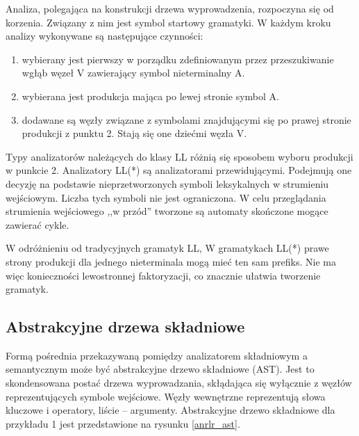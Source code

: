 Analiza, polegająca na konstrukcji drzewa
wyprowadzenia, rozpoczyna się od korzenia. Związany z nim jest symbol 
startowy gramatyki. W każdym kroku analizy wykonywane są następujące czynności:
\begin{enumerate}
\item wybierany jest pierwszy w porządku zdefiniowanym przez
  przeszukiwanie wgłąb węzeł V zawierający symbol nieterminalny A.
\item wybierana jest produkcja mająca po lewej stronie symbol A.
\item dodawane są węzły związane z symbolami znajdującymi się po prawej
  stronie produkcji z punktu 2. Stają się one dziećmi węzła V.
\end{enumerate}

Typy analizatorów należących do klasy LL różnią się sposobem wyboru produkcji w punkcie 2. 
Analizatory LL(*) są analizatorami przewidującymi. Podejmują one decyzję na
podstawie nieprzetworzonych symboli leksykalnych w strumieniu wejściowym. Liczba
tych symboli nie jest ograniczona. W celu przeglądania strumienia wejściowego 
,,w przód'' tworzone są automaty skończone mogące zawierać cykle.

W odróżnieniu od tradycyjnych gramatyk LL, W gramatykach LL(*) prawe strony
produkcji dla jednego nieterminala mogą mieć ten sam prefiks. Nie ma więc 
konieczności lewostronnej faktoryzacji, co znacznie ułatwia tworzenie
gramatyk.

\subsection{Abstrakcyjne drzewa składniowe}

Formą pośrednia przekazywaną pomiędzy analizatorem składniowym a semantycznym
może być abstrakcyjne drzewo składniowe (AST). Jest to skondensowana postać drzewa
wyprowadzania, skłądająca się
wyłącznie z węzłów reprezentujących symbole wejściowe. Węzły
wewnętrzne reprezentują słowa kluczowe i operatory, liście -- argumenty.
Abstrakcyjne drzewo składniowe dla przykładu 1 jest przedstawione na rysunku 
\ref{anrlr_ast}.

